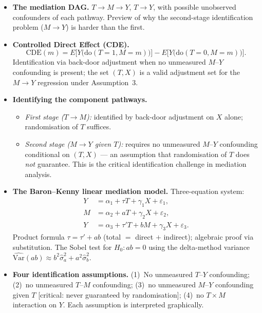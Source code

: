 \documentclass[12pt]{article}
\begin{document}
\begin{itemize}
  \item \textbf{The mediation DAG.}
    $T \to M \to Y$, $T \to Y$, with possible unobserved confounders
    of each pathway. Preview of why the second-stage identification
    problem ($M \to Y$) is harder than the first.

  \item \textbf{Controlled Direct Effect (CDE).}
    \[
      \mathrm{CDE}(m)
      = E\!\bigl[Y\bigl(\mathrm{do}(T{=}1, M{=}m)\bigr)\bigr]
      - E\!\bigl[Y\bigl(\mathrm{do}(T{=}0, M{=}m)\bigr)\bigr].
    \]
    Identification via back-door adjustment when no unmeasured $M$--$Y$
    confounding is present; the set $(T, X)$ is a valid adjustment set
    for the $M \to Y$ regression under Assumption~3.

  \item \textbf{Identifying the component pathways.}
    \begin{itemize}
      \item \emph{First stage ($T \to M$):} identified by back-door
        adjustment on $X$ alone; randomisation of $T$ suffices.
      \item \emph{Second stage ($M \to Y$ given $T$):} requires no
        unmeasured $M$--$Y$ confounding conditional on $(T, X)$ ---
        an assumption that randomisation of $T$ does \emph{not}
        guarantee. This is the critical identification challenge in
        mediation analysis.
    \end{itemize}

  \item \textbf{The Baron--Kenny linear mediation model.}
    Three-equation system:
    \begin{align*}
      Y &= \alpha_1 + \tau T + \gamma_1 X + \varepsilon_1, \\
      M &= \alpha_2 + a T + \gamma_2 X + \varepsilon_2, \\
      Y &= \alpha_3 + \tau' T + b M + \gamma_3 X + \varepsilon_3.
    \end{align*}
    Product formula $\tau = \tau' + ab$ (total $=$ direct $+$ indirect);
    algebraic proof via substitution. The Sobel test for $H_0: ab = 0$
    using the delta-method variance
    $\widehat{\mathrm{Var}}(ab) \approx b^2 \hat\sigma_a^2
     + a^2 \hat\sigma_b^2$.

  \item \textbf{Four identification assumptions.}
    (1)~No unmeasured $T$--$Y$ confounding; (2)~no unmeasured $T$--$M$
    confounding; (3)~no unmeasured $M$--$Y$ confounding given $T$
    [critical: never guaranteed by randomisation]; (4)~no $T \times M$
    interaction on $Y$.  Each assumption is interpreted graphically.


\end{itemize}
\end{document}
